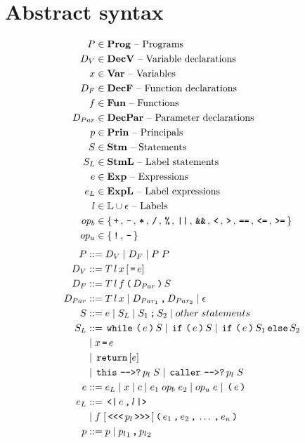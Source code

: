 \section{Abstract syntax}

\begin{align*}
  P       & \in \mathbf{Prog} \text{ -- Programs}\\
  D_V     & \in \mathbf{DecV} \text{ -- Variable declarations}\\
  x       & \in \mathbf{Var} \text{ -- Variables}\\
  D_F     & \in \mathbf{DecF} \text{ -- Function declarations}\\
  f       & \in \mathbf{Fun} \text{ -- Functions}\\
  D_{Par} & \in \mathbf{DecPar} \text{ -- Parameter declarations}\\
  p       & \in \mathbf{Prin} \text{ -- Principals}\\
  S       & \in \mathbf{Stm} \text{ -- Statements}\\
  S_L     & \in \mathbf{StmL} \text{ -- Label statements}\\
  e       & \in \mathbf{Exp} \text{ -- Expressions}\\
  e_L     & \in \mathbf{ExpL} \text{ -- Label expressions}\\
  l       & \in \mathbb{L} \cup \epsilon \text{ -- Labels}\\
  op_b    & \in \{ \, \texttt{+} \, ,  \, \texttt{-} \, ,  \, \texttt{*} \, ,  \, \texttt{/} \, ,  \, \texttt{\%} \, ,  \, \texttt{||} \, ,  \, \texttt{\&\&} \, ,  \, \texttt{<} \, ,  \, \texttt{>} \, ,  \, \texttt{==} \, ,  \, \texttt{<=} \, ,  \, \texttt{>=} \, \} \\
  op_u    & \in \{ \, \texttt{!} \, ,  \, \texttt{-} \, \}
\end{align*}
\begin{align*}
  P         & ::= D_V \gp D_F \gp P \; P \\
  D_V       & ::= T \, l \, x \, [\tk = e] \\
  D_F       & ::= T \, l \, f \tk ( D_{Par} \tk ) S \\
  D_{Par}   & ::= T \, l \, x \gp D_{Par_1} \tk , D_{Par_2} \gp \epsilon \\
  S         & ::= e \gp S_L \gp S_1 \tk ; S_2 \gp other \; statements \\
  S_L       & ::= \tk{while} \tk ( e \tk ) S \gp \tk{if} \tk ( e \tk ) S \gp \tk{if} \tk ( e \tk ) S_1 \tk{else} S_2 \\
            & \gp x \tk = e \\
            & \gp \tk{return} [e] \\
            & \gp \tk{this} \tk{-{}->?} p_l \; S \gp \tk{caller} \tk{-{}->?} p_l \; S \\
  e         & ::= e_L \gp x \gp c \gp e_1 \; op_b \; e_2 \gp op_u \; e \gp \tk ( e \tk ) \\
  e_L       & ::= \tk{<|} e \tk , l \tk{|>} \\
            & \gp f \; [\tk{<{}<{}<} p_l \tk{>{}>{}>}] \tk ( e_1 \tk , e_2 \tk , \dots \tk , e_n \tk ) \\
  p         & ::= p \gp {p_l}_1 \tk , {p_l}_2
\end{align*}

